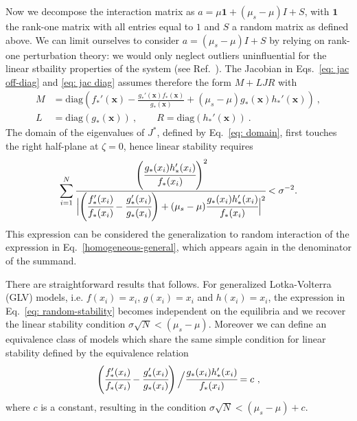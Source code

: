 \documentclass[
 reprint,
 amsmath,amssymb,
 aps,
]{revtex4-2}
\begin{document}
Now we decompose the interaction matrix as
$a = \mu \mathbf{1} + (\mu_s-\mu)I + S$,
with $\mathbf{1}$ the rank-one matrix with all entries equal to $1$
and $S$ a random matrix as defined above.
We can limit ourselves to consider 
$a = (\mu_s-\mu)I + S$ by relying on 
rank-one perturbation theory: we would only neglect outliers
uninfluential for the linear stbaility properties of the system (see Ref.~\cite{Stone2018}).
The Jacobian in Eqs.~\eqref{eq: jac off-diag} and \eqref{eq: jac diag} assumes therefore the form $M + LJR$ with
\begin{align}
    M & = \textrm{diag}\left(f_*'(\mathbf x) -
    \frac{g_*'(\mathbf x)f_*(\mathbf x)}{g_*(\mathbf x)}
    +(\mu_s-\mu)g_*(\mathbf x)h_*'(\mathbf x)\right) \ , \\
    L &= \textrm{diag}(g_*(\mathbf x)) \ , \qquad  
    R = \textrm{diag}(h_*'(\mathbf x)) \ . \nonumber
\end{align}
The domain of the eigenvalues of $J^*$, defined by
Eq.~\eqref{eq: domain}, 
first touches the right half-plane at $\zeta = 0$, 
hence linear stability requires   
\begin{equation}\label{eq: random-stability}
    \sum_{i=1}^N \cfrac{\left(\cfrac{g_*(x_i)h_*'(x_i)}{f_*(x_i)}\right)^2}{
        \Bigl |\left(\cfrac{f_*'(x_i)}{f_*(x_i)} -
        \cfrac{g_*'(x_i)}{g_*(x_i)}\right)
        +(\mu_s-\mu) \cfrac{g_*(x_i)h_*'(x_i)}{f_*(x_i)} \Bigl |^2}
    < \sigma^{-2}. 
\end{equation}
This expression can be considered the
generalization to random interaction of
the expression in Eq.~\eqref{homogeneous-general},
which appears again in the denominator of the summand.

There are straightforward results that follows.
For generalized Lotka-Volterra (GLV) models,
i.e. $f(x_i)=x_i$, $g(x_i)=x_i$ and $h(x_i)=x_i$,
the expression in Eq.~\eqref{eq: random-stability}
becomes independent on the equilibria and we 
recover the linear stability condition
$\sigma\sqrt{N} < (\mu_s-\mu)$.
Moreover we can define an equivalence class of models
which share the same simple condition
for linear stability defined by the equivalence relation
\begin{equation}\label{eq: equiv class glv}
    \left(\cfrac{f_*'(x_i)}{f_*(x_i)} -
        \cfrac{g_*'(x_i)}{g_*(x_i)}\right)\Bigl/
        \cfrac{g_*(x_i)h_*'(x_i)}{f_*(x_i)}=c \ ,
\end{equation}
where $c$ is a constant,
resulting in the condition $\sigma\sqrt{N} < (\mu_s-\mu) +c$.
\end{document}
